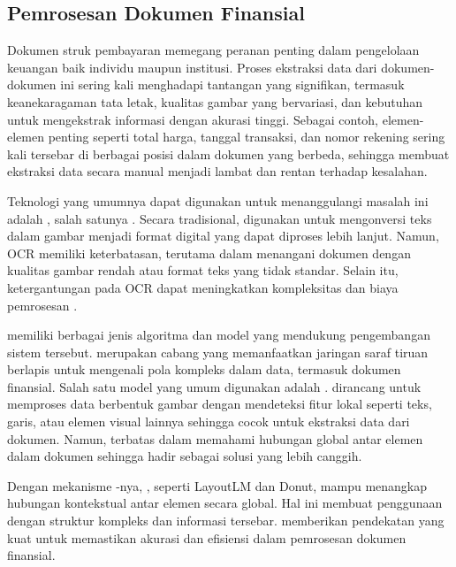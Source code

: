 \subsection{Pemrosesan Dokumen Finansial}
\label{subsec:pemrosesan-dokumen-finansial}

Dokumen struk pembayaran memegang peranan penting dalam pengelolaan 
keuangan baik individu maupun institusi. Proses ekstraksi data dari dokumen-dokumen ini sering kali menghadapi tantangan yang signifikan, termasuk keanekaragaman tata letak, kualitas gambar yang bervariasi, dan kebutuhan untuk 
mengekstrak informasi dengan akurasi tinggi. Sebagai contoh, elemen-elemen penting seperti total harga, tanggal transaksi, dan nomor rekening sering kali tersebar di berbagai posisi dalam dokumen yang berbeda, sehingga membuat ekstraksi data secara manual menjadi lambat dan rentan terhadap kesalahan. 

Teknologi yang umumnya dapat digunakan untuk menanggulangi masalah ini adalah \cv{}, salah satunya \ocr. Secara tradisional, \ocr{} digunakan untuk mengonversi teks dalam gambar menjadi format digital yang dapat diproses lebih lanjut. Namun, OCR memiliki 
keterbatasan, terutama dalam menangani dokumen dengan kualitas gambar rendah atau format teks yang tidak standar. Selain itu, ketergantungan pada OCR dapat meningkatkan kompleksitas dan biaya pemrosesan \parencite{kim2021donut}.

\dlfl{} memiliki berbagai jenis algoritma dan model yang mendukung pengembangan sistem tersebut. \dl{} merupakan cabang \ml{} yang memanfaatkan jaringan saraf tiruan berlapis untuk mengenali pola kompleks dalam data, termasuk dokumen finansial. Salah satu model yang umum digunakan adalah \cnn. \cnn{} dirancang untuk memproses data berbentuk gambar dengan mendeteksi fitur lokal seperti teks, garis, atau elemen visual lainnya sehingga cocok untuk ekstraksi data dari dokumen. Namun, \cnn{} terbatas dalam memahami hubungan global antar 
elemen dalam dokumen sehingga \transformer{} hadir sebagai solusi yang lebih canggih. \parencite{alzubaidi2021review}

Dengan mekanisme \attention-nya, \transformer{}, seperti LayoutLM dan 
Donut, mampu menangkap hubungan kontekstual antar elemen secara global. Hal ini membuat penggunaan \transformer{} dengan struktur kompleks dan informasi 
tersebar. \transformer{} memberikan pendekatan yang kuat untuk memastikan akurasi dan efisiensi dalam pemrosesan dokumen finansial.